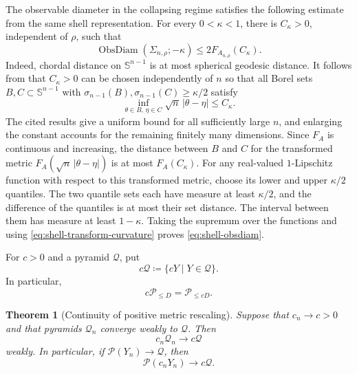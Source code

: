 \documentclass{amsart}
\numberwithin{equation}{section}
\theoremstyle{plain}
\newtheorem{thm}{Theorem}[section]
\theoremstyle{definition}
\theoremstyle{remark}
\newcommand{\Sph}{\mathbb{S}}
\newcommand{\Pyr}{\mathcal{P}}
\DeclareMathOperator{\ObsDiam}{ObsDiam}
\begin{document}
The observable diameter in the collapsing regime satisfies the following
estimate from the same shell representation.  For
every $0<\kappa<1$, there is $C_\kappa>0$, independent of $\rho$, such that
\begin{equation}\label{eq:shell-obsdiam}
	\ObsDiam(\Sigma_{n,\rho};-\kappa)
	\le2F_{A_{n,\rho}}(C_\kappa).
\end{equation}
Indeed, chordal distance on $\Sph^{n-1}$ is at most spherical geodesic
distance.  It follows from
\cite[Lemma~2.25, Propositions~2.19 and~2.26, and
Theorem~2.21]{shioya2016mmg} that $C_\kappa>0$ can be chosen independently
of $n$ so that all Borel sets $B,C\subset\Sph^{n-1}$ with
$\sigma_{n-1}(B),\sigma_{n-1}(C)\ge\kappa/2$ satisfy
\[ \inf_{\theta\in B,\,\eta\in C}\sqrt n\,|\theta-\eta|\le C_\kappa. \]
The cited results give a uniform bound for all sufficiently large $n$, and
enlarging the constant accounts for the remaining finitely many dimensions.
Since $F_A$ is continuous and increasing, the distance between $B$ and $C$
for the transformed metric $F_A(\sqrt n\,|\theta-\eta|)$ is at most
$F_A(C_\kappa)$.  For any real-valued $1$-Lipschitz function with respect to
this transformed metric, choose its lower and upper $\kappa/2$ quantiles.
The two quantile sets each have measure at least $\kappa/2$, and the
difference of the quantiles is at most their set distance.  The interval
between them has measure at least $1-\kappa$.  Taking the supremum over the
functions and using \eqref{eq:shell-transform-curvature} proves
\eqref{eq:shell-obsdiam}.

For $c>0$ and a pyramid $\mathcal Q$, put
\[ c\mathcal Q\coloneqq\{cY\mid Y\in\mathcal Q\}. \]
In particular,
\[ c\mathcal P_{\le D}=\mathcal P_{\le cD}. \]

\begin{thm}[Continuity of positive metric rescaling]
\label{thm:rescaling-continuity}
	Suppose that $c_n\to c>0$ and that pyramids $\mathcal Q_n$ converge
	weakly to $\mathcal Q$.  Then
	\[
		c_n\mathcal Q_n\longrightarrow c\mathcal Q
	\]
	weakly.  In particular, if $\Pyr(Y_n)\to\mathcal Q$, then
	\[
		\Pyr(c_nY_n)\longrightarrow c\mathcal Q.
	\]
\end{thm}
\end{document}
